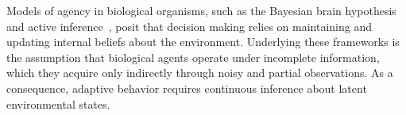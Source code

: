 \documentclass{article}
\theoremstyle{plain}
\theoremstyle{definition}
\theoremstyle{remark}
\newcommand{\<}{\langle}
\renewcommand{\>}{\rangle}
\begin{document}


 Models of agency in biological organisms, such as the Bayesian brain hypothesis~\cite{KNILL2004712} and active inference~\cite{Friston2010, 10.7551/mitpress/12441.001.0001}, posit that decision making relies on maintaining and updating internal beliefs about the environment. Underlying these frameworks is the assumption that biological agents operate under incomplete information, which they acquire only indirectly through noisy and partial observations. As a consequence, adaptive behavior requires continuous inference about latent environmental states.
\end{document}
